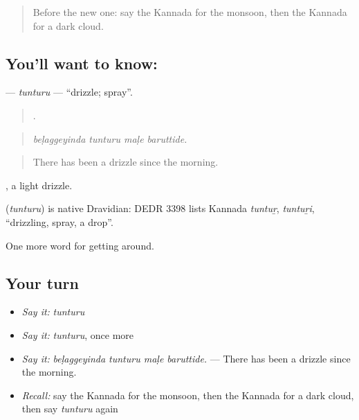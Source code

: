 \label{lesson:KA-C485-tunturu}



\begin{quote}
Before the new one: say the Kannada for the monsoon, then the Kannada for a dark cloud.
\end{quote}

\subsection*{You'll want to know: }
\textbf{} — \emph{tunturu} — \textquotedblleft{}drizzle; spray\textquotedblright{}.

\begin{quote}
   .
\end{quote}

\begin{quote}
\emph{beḷaggeyinda tunturu maḷe baruttide.}
\end{quote}

\begin{quote}
There has been a drizzle since the morning.
\end{quote}

 , a light drizzle.

\begin{cousinweb}
\textbf{} (\emph{tunturu}) is native Dravidian: DEDR 3398 lists Kannada \emph{tuntuṟ}, \emph{tuntuṟi}, \textquotedblleft{}drizzling, spray, a drop\textquotedblright{}.
\end{cousinweb}

\begin{grammarlens}[title={What you've built}]
One more word for getting around.
\end{grammarlens}

\subsection*{Your turn}
\begin{itemize}
\raggedright
  \item \emph{Say it:} \emph{tunturu}
  \item \emph{Say it:} \emph{tunturu}, once more
  \item \emph{Say it:} \emph{beḷaggeyinda tunturu maḷe baruttide.} — There has been a drizzle since the morning.
  \item \emph{Recall:} say the Kannada for the monsoon, then the Kannada for a dark cloud, then say \emph{tunturu} again
\end{itemize}

